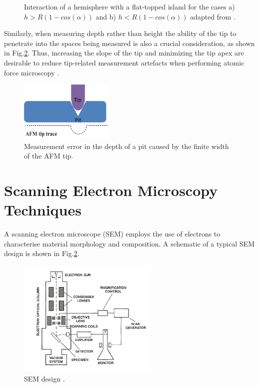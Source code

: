 \begin{figure}[h]
\begin{subfigure}[t]{0.4\textwidth}
		\caption{}
	\end{subfigure}
	\caption {Interaction of a hemisphere with a flat-topped island for the cases a) $h > R(1-cos(\alpha))$ and b) $h < R(1-cos(\alpha))$ adapted from \cite{Oliver2008}. }
	\label{2.3}
\end{figure}
\FloatBarrier 

Similarly, when measuring depth rather than height the ability of the tip to penetrate into the spaces being measured is also a crucial consideration, as shown in Fig.\ref{2.4}. Thus, increasing the slope of the tip and minimizing the tip apex are desirable to reduce tip-related measurement artefacts when performing atomic force microscopy \cite{Oliver2008}.

\begin{figure}[h]
	\centering
	\includegraphics[width=0.4\textwidth]{Figs/Ch2/afm3.png}
	\caption {Measurement error in the depth of a pit caused by the finite width of the AFM tip.}
\end{figure}
\FloatBarrier


\section{Scanning Electron Microscopy Techniques}

A scanning electron microscope   (SEM) employs the use of electrons to characterise material morphology and composition. A schematic of a typical SEM design is shown in Fig.\ref{2.4}.

\begin{figure}[h]
	\centering
	\includegraphics[width=0.6\textwidth]{Figs/Ch2/SEM.png}
	\caption {SEM design \cite{YacobiHolt1990}.}
	\label{2.4}
\end{figure}
\FloatBarrier

